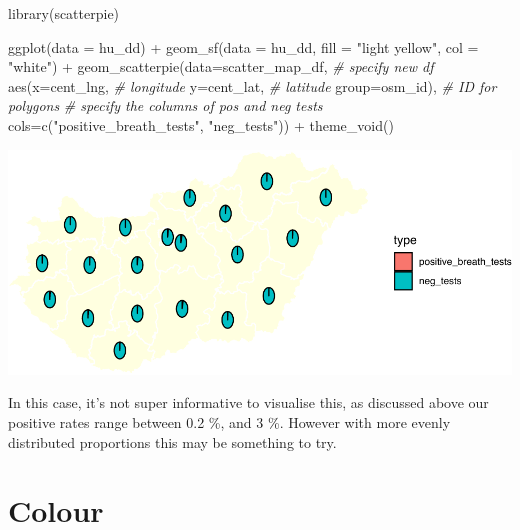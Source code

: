 \documentclass[
  krantz2]{krantz}
\makeatletter
\newenvironment{Shaded}{\begin{snugshade}}{\end{snugshade}}
\newcommand{\AttributeTok}[1]{\textcolor[rgb]{0.61,0.61,0.61}{#1}}
\newcommand{\CommentTok}[1]{\textcolor[rgb]{0.37,0.37,0.37}{\textit{#1}}}
\newcommand{\FunctionTok}[1]{\textcolor[rgb]{0,0,0}{#1}}
\newcommand{\NormalTok}[1]{#1}
\newcommand{\SpecialCharTok}[1]{\textcolor[rgb]{0,0,0}{#1}}
\newcommand{\StringTok}[1]{\textcolor[rgb]{0.5,0.5,0.5}{#1}}
\newenvironment{kframe}{%
\medskip{}
\setlength{\fboxsep}{.8em}
 \def\at@end@of@kframe{}%
 \ifinner\ifhmode%
  \def\at@end@of@kframe{\end{minipage}}%
  \begin{minipage}{\columnwidth}%
 \fi\fi%
 \def\FrameCommand##1{\hskip\@totalleftmargin \hskip-\fboxsep
 \colorbox{shadecolor}{##1}\hskip-\fboxsep
     \hskip-\linewidth \hskip-\@totalleftmargin \hskip\columnwidth}%
 \MakeFramed {\advance\hsize-\width
   \@totalleftmargin\z@ \linewidth\hsize
   \@setminipage}}%
 {\par\unskip\endMakeFramed%
 \at@end@of@kframe}
\renewenvironment{Shaded}{\begin{kframe}}{\end{kframe}}
\makeatother
\begin{document}
\begin{Shaded}
\begin{Highlighting}[]
\FunctionTok{library}\NormalTok{(scatterpie)}

\FunctionTok{ggplot}\NormalTok{(}\AttributeTok{data =}\NormalTok{ hu\_dd) }\SpecialCharTok{+} 
  \FunctionTok{geom\_sf}\NormalTok{(}\AttributeTok{data =}\NormalTok{ hu\_dd, }
          \AttributeTok{fill =} \StringTok{"light yellow"}\NormalTok{, }
          \AttributeTok{col =} \StringTok{"white"}\NormalTok{) }\SpecialCharTok{+} 
  \FunctionTok{geom\_scatterpie}\NormalTok{(}\AttributeTok{data=}\NormalTok{scatter\_map\_df,   }\CommentTok{\# specify new df}
                  \FunctionTok{aes}\NormalTok{(}\AttributeTok{x=}\NormalTok{cent\_lng,        }\CommentTok{\# longitude}
                      \AttributeTok{y=}\NormalTok{cent\_lat,        }\CommentTok{\# latitude}
                      \AttributeTok{group=}\NormalTok{osm\_id),     }\CommentTok{\# ID for polygons}
                  \CommentTok{\# specify the columns of pos and neg tests}
                  \AttributeTok{cols=}\FunctionTok{c}\NormalTok{(}\StringTok{"positive\_breath\_tests"}\NormalTok{, }\StringTok{"neg\_tests"}\NormalTok{)) }\SpecialCharTok{+} 
  \FunctionTok{theme\_void}\NormalTok{()}
\end{Highlighting}
\end{Shaded}

\includegraphics{crime_mapping_files/figure-latex/unnamed-chunk-156-1.pdf}

In this case, it's not super informative to visualise this, as discussed above our positive rates range between 0.2 \%, and 3 \%. However with more evenly distributed proportions this may be something to try.

\hypertarget{colour}{%
\section{Colour}\label{colour}}
\end{document}
